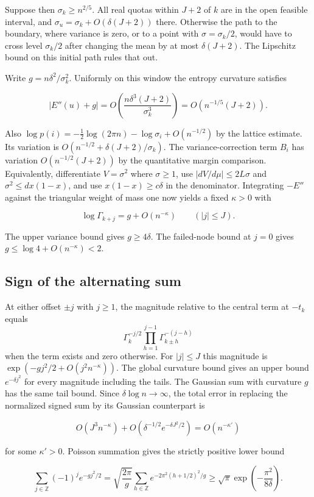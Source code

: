 Suppose then $\sigma_k\ge n^{2/5}$. All real quotas within $J+2$ of $k$ are in the open feasible interval, and $\sigma_u=\sigma_k+O(\delta(J+2))$ there. Otherwise the path to the boundary, where variance is zero, or to a point with $\sigma=\sigma_k/2$, would have to cross level $\sigma_k/2$ after changing the mean by at most $\delta(J+2)$. The Lipschitz bound on this initial path rules that out.

Write $g=n\delta^2/\sigma_k^2$. Uniformly on this window the entropy curvature satisfies

\[
|E''(u)+g|=O\left(\frac{n\delta^3(J+2)}{\sigma_k^3}\right)=O(n^{-1/5}(J+2)).
\]

Also $\log p(i)=-\tfrac12\log(2\pi n)-\log\sigma_i+O(n^{-1/2})$ by the lattice estimate. Its variation is $O(n^{-1/2}+\delta(J+2)/\sigma_k)$. The variance-correction term $B_i$ has variation $O(n^{-1/2}(J+2))$ by the quantitative margin comparison. Equivalently, differentiate $V=\sigma^2$ where $\sigma\ge1$, use $|dV/d\mu|\le 2L\sigma$ and $\sigma^2\le dx(1-x)$, and use $x(1-x)\ge c\delta$ in the denominator. Integrating $-E''$ against the triangular weight of mass one now yields a fixed $\kappa>0$ with

\[
\log\Gamma_{k+j}=g+O(n^{-\kappa})\qquad (|j|\le J).
\]

The upper variance bound gives $g\ge4\delta$. The failed-node bound at $j=0$ gives $g\le\log4+O(n^{-\kappa})<2$.

\subsection{Sign of the alternating sum}

At either offset $\pm j$ with $j\ge1$, the magnitude relative to the
central term at $-t_k$ equals
\[
\Gamma_k^{-j/2}\prod_{h=1}^{j-1}\Gamma_{k\pm h}^{-(j-h)}
\]
when the term exists and zero otherwise. For $|j|\le J$ this magnitude
is $\exp(-gj^2/2+O(j^2 n^{-\kappa}))$. The global curvature bound gives an upper bound $e^{-\delta j^2}$ for every magnitude including the tails. The Gaussian sum with curvature $g$ has the same tail bound. Since $\delta\log n\to\infty$, the total error in replacing the normalized signed sum by its Gaussian counterpart is

\[
O(J^3n^{-\kappa})+O\left(\delta^{-1/2}e^{-\delta J^2/2}\right)=O(n^{-\kappa'})
\]

for some $\kappa'>0$. Poisson summation gives the strictly positive lower bound

\[
\sum_{j\in\mathbb Z}(-1)^je^{-gj^2/2}
=\sqrt{\frac{2\pi}{g}}\sum_{h\in\mathbb Z}e^{-2\pi^2(h+1/2)^2/g}
\ge\sqrt{\pi}\exp\left(-\frac{\pi^2}{8\delta}\right).
\]

